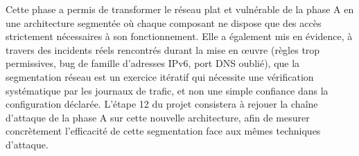 Cette phase a permis de transformer le réseau plat et vulnérable de la
phase A en une architecture segmentée où chaque composant ne dispose que
des accès strictement nécessaires à son fonctionnement. Elle a également
mis en évidence, à travers des incidents réels rencontrés durant la mise
en œuvre (règles trop permissives, bug de famille d'adresses IPv6, port
DNS oublié), que la segmentation réseau est un exercice itératif qui
nécessite une vérification systématique par les journaux de trafic, et
non une simple confiance dans la configuration déclarée. L'étape 12 du
projet consistera à rejouer la chaîne d'attaque de la phase A sur cette
nouvelle architecture, afin de mesurer concrètement l'efficacité de cette
segmentation face aux mêmes techniques d'attaque.

